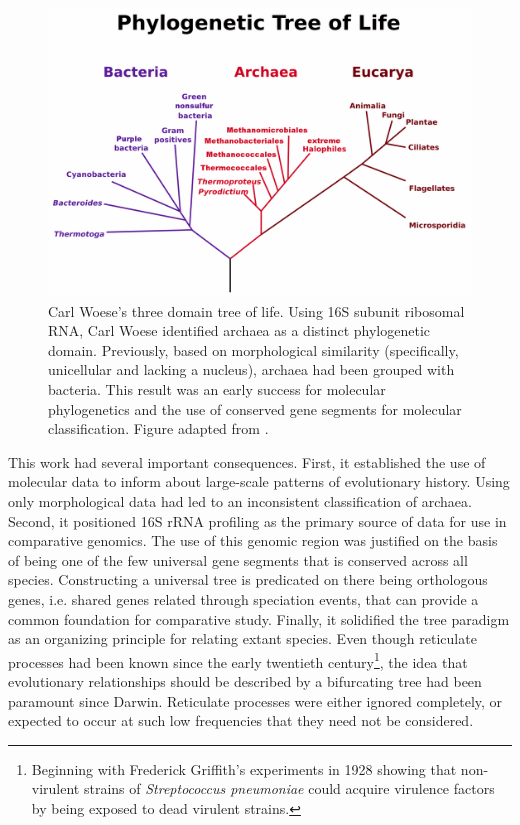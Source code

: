 \begin{figure}
\centering
\includegraphics[width=.7\columnwidth]{./fig/introduction/woese_tree.png}
\caption[Carl Woese's Three Domain Tree of Life]{Carl Woese's three domain tree of life. Using 16S subunit ribosomal RNA, Carl Woese identified archaea as a distinct phylogenetic domain. Previously, based on morphological similarity (specifically, unicellular and lacking a nucleus), archaea had been grouped with bacteria. This result was an early success for molecular phylogenetics and the use of conserved gene segments for molecular classification. Figure adapted from \cite{Woese:1990uc}.}
\label{fig:woese_tree}
\end{figure}

This work had several important consequences.
First, it established the use of molecular data to inform about large-scale patterns of evolutionary history.
Using only morphological data had led to an inconsistent classification of archaea.
Second, it positioned 16S rRNA profiling as the primary source of data for use in comparative genomics.
The use of this genomic region was justified on the basis of being one of the few universal gene segments that is conserved across all species.
Constructing a universal tree is predicated on there being orthologous genes, i.e. shared genes related through speciation events, that can provide a common foundation for comparative study.
Finally, it solidified the tree paradigm as an organizing principle for relating extant species.
Even though reticulate processes had been known since the early twentieth century\footnote{Beginning with Frederick Griffith's experiments in 1928 showing that non-virulent strains of \emph{Streptococcus pneumoniae} could acquire virulence factors by being exposed to dead virulent strains.}, the idea that evolutionary relationships should be described by a bifurcating tree had been paramount since Darwin. 
Reticulate processes were either ignored completely, or expected to occur at such low frequencies that they need not be considered.

